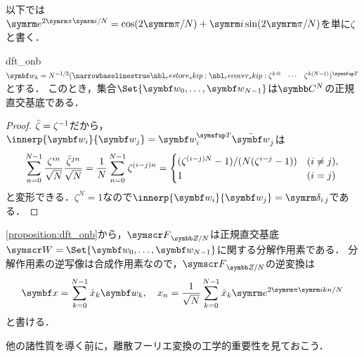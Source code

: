 \documentclass[../../main]{subfiles}
\begin{document}
以下では\(\napr^{2\krez\iuni/N}=\cos(2\krez/N)+\iuni\sin(2\krez/N)\)を単に\(\zeta\)と書く．

\begin{proposition}{}{dft_onb}
  \(\vect{w}_k=N^{-1/2}\trps{\rowvect{\zeta^{k\cdot 0} & \cdots & \zeta^{k(N-1)}}}\)とする．
  このとき，集合\(\Set{\vect{w}_0,\dots,\vect{w}_{N-1}}\)は\(\numset{C}^N\)の正規直交基底である．
\end{proposition}

\begin{proof}
  \(\conj{\zeta}=\zeta^{-1}\)だから，\(\innerp{\vect{w}_i}{\vect{w}_j}=\trps{\vect{w}_i}\conj{\vect{w}}_j\)は
  \[
    \sum_{n=0}^{N-1}\frac{\zeta^{in}}{\sqrt{N}}\frac{\conj{\zeta}^{jn}}{\sqrt{N}} = \frac{1}{N}\sum_{n=0}^{N-1}\zeta^{(i-j)n}
    = \begin{cases}(\zeta^{(i-j)N}-1)/(N(\zeta^{i-j}-1)) & (i\neq j), \\ 1 & (i=j)\end{cases}
  \]
  と変形できる．\(\zeta^N=1\)なので\(\innerp{\vect{w}_i}{\vect{w}_j}=\kdelta{i}{j}\)である．
\end{proof}

\cref{proposition:dft_onb}から，\(\dft{N}\)は正規直交基底\(\basis{W}=\Set{\vect{w}_0,\dots,\vect{w}_{N-1}}\)に関する分解作用素である．
分解作用素の逆写像は合成作用素なので，\(\dft{N}\)の逆変換は
\begin{equation}
  \label{equation:idft}
  \vect{x} = \sum_{k=0}^{N-1}\hat{x}_k\vect{w}_k,
  \quad x_n = \frac{1}{\sqrt{N}}\sum_{k=0}^{N-1}\hat{x}_k\napr^{2\krez\iuni kn/N}
\end{equation}
と書ける．

他の諸性質を導く前に，離散フーリエ変換の工学的重要性を見ておこう．
\end{document}
